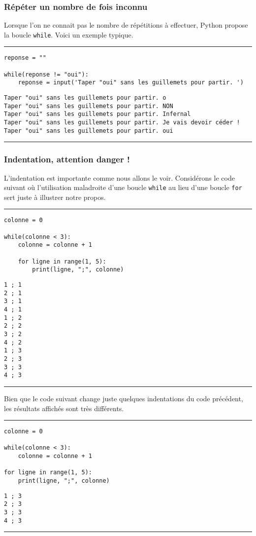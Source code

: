 \subsubsection{Répéter un nombre de fois inconnu}

Lorsque l'on ne connait pas le nombre de répétitions à effectuer, Python propose la boucle \texttt{while}. Voici un exemple typique.


\bigskip
{\hrule height .5mm}
\begin{verbatim}
reponse = ""

while(reponse != "oui"):
    reponse = input('Taper "oui" sans les guillemets pour partir. ')
\end{verbatim}
 \color{ForestGreen}
\vspace{-1.5em}
\begin{verbatim}
Taper "oui" sans les guillemets pour partir. o
Taper "oui" sans les guillemets pour partir. NON
Taper "oui" sans les guillemets pour partir. Infernal
Taper "oui" sans les guillemets pour partir. Je vais devoir céder !
Taper "oui" sans les guillemets pour partir. oui
\end{verbatim} \color{Black}
{\hrule height .5mm}
\bigskip


\subsubsection{Indentation, attention danger !}

L'indentation est importante comme nous allons le voir. Considérons le code suivant où l'utilisation maladroite d'une boucle \texttt{while} au lieu d'une boucle \texttt{for} sert juste à illustrer notre propos.


\bigskip
{\hrule height .5mm}
\begin{verbatim}
colonne = 0

while(colonne < 3):
    colonne = colonne + 1

    for ligne in range(1, 5):
        print(ligne, ";", colonne)
\end{verbatim}
 \color{ForestGreen}
\vspace{-1.5em}
\begin{verbatim}
1 ; 1
2 ; 1
3 ; 1
4 ; 1
1 ; 2
2 ; 2
3 ; 2
4 ; 2
1 ; 3
2 ; 3
3 ; 3
4 ; 3
\end{verbatim} \color{Black}
{\hrule height .5mm}
\bigskip


Bien que le code suivant change juste quelques indentations du code précédent, les résultats affichés sont très différents.


\bigskip
{\hrule height .5mm}
\begin{verbatim}
colonne = 0

while(colonne < 3):
    colonne = colonne + 1

for ligne in range(1, 5):
    print(ligne, ";", colonne)
\end{verbatim}
 \color{ForestGreen}
\vspace{-1.5em}
\begin{verbatim}
1 ; 3
2 ; 3
3 ; 3
4 ; 3
\end{verbatim} \color{Black}
{\hrule height .5mm}
\bigskip